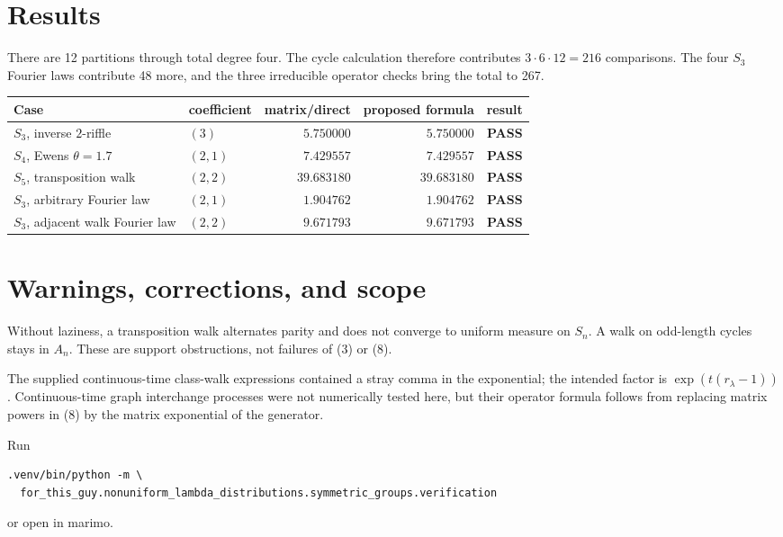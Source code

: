 \documentclass[11pt]{article}
\newcommand{\PASS}{\textcolor{passgreen}{\textbf{PASS}}}
\begin{document}
\section{Results}
There are 12 partitions through total degree four.  The cycle calculation
therefore contributes $3\cdot6\cdot12=216$ comparisons.  The four $S_3$
Fourier laws contribute 48 more, and the three irreducible operator checks
bring the total to 267.
\begin{center}
\begin{tabularx}{\linewidth}{@{}lXrrc@{}}
\toprule
Case & coefficient & matrix/direct & proposed formula & result\\
\midrule
$S_3$, inverse $2$-riffle & $(3)$ & $5.750000$ & $5.750000$ & \PASS\\
$S_4$, Ewens $\theta=1.7$ & $(2,1)$ & $7.429557$ & $7.429557$ & \PASS\\
$S_5$, transposition walk & $(2,2)$ & $39.683180$ & $39.683180$ & \PASS\\
$S_3$, arbitrary Fourier law & $(2,1)$ & $1.904762$ & $1.904762$ & \PASS\\
$S_3$, adjacent walk Fourier law & $(2,2)$ & $9.671793$ & $9.671793$ & \PASS\\
\bottomrule
\end{tabularx}
\end{center}

\section{Warnings, corrections, and scope}
Without laziness, a transposition walk alternates parity and does not converge
to uniform measure on $S_n$.  A walk on odd-length cycles stays in $A_n$.
These are support obstructions, not failures of (3) or (8).

The supplied continuous-time class-walk expressions contained a stray comma
in the exponential; the intended factor is
$\exp(t(r_\lambda-1))$.  Continuous-time graph interchange processes were not
numerically tested here, but their operator formula follows from replacing
matrix powers in (8) by the matrix exponential of the generator.

Run
\begin{verbatim}
.venv/bin/python -m \
  for_this_guy.nonuniform_lambda_distributions.symmetric_groups.verification
\end{verbatim}
or open  in marimo.
\end{document}

